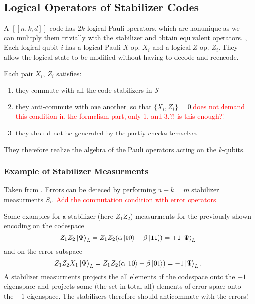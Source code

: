 \subsection{Logical Operators of Stabilizer Codes}
A $[[n,k,d]]$ code has $2k$ logical Pauli operators, which are nonunique as we can mulitply them trivially with the stabilizer and obtain equivalent operators. \cite{QECintro},\cite{QECmemory} 
Each logical qubit $i$ has a logical Pauli-$X$ op. $\bar{X}_i$ and a logical-$Z$ op. $\bar{Z}_i$. 
They allow the logical state to be modified without having to decode and reencode. \cite{QECintro}

Each pair $\bar{X}_i$, $\bar{Z}_i$ satisfies:
\begin{enumerate}
    \item they commute with all the code stabilizers in $\mathcal{S}$ 
    \item they anti-commute with one another, so that $\{ \bar{X}_i, \bar{Z_i}\}=0$ \textcolor{red}{\cite{QECmemory} does not demand this condition in the formalism part, only 1. and 3.?! is this enough?!}
    \item they should not be generated by the partiy checks temselves \cite{QECmemory}
\end{enumerate}
They therefore realize the algebra of the Pauli operators acting on the $k$-qubits. \cite{QECmemory}


\subsubsection{Example of Stabilizer Measurments}
Taken from \cite{QECintro}.
Errors can be deteced by performing $n-k=m$ stabilizer measurments $S_i$.
\textcolor{red}{Add the commutation condition with error operators}

Some examples for a stabilizer (here $Z_1 Z_2$) measurments for the previously shown encoding on the codespace
\begin{equation}
    Z_1 Z_2 \ket{\Psi}_L = Z_1 Z_2 (\alpha \ket{00}+ \beta \ket{11}) = +1 \ket{\Psi}_L
\end{equation}
and on the error subspace
\begin{equation}
    Z_1 Z_2 X_1\ket{\Psi}_L = Z_1 Z_2 (\alpha \ket{10}+ \beta \ket{01}) = -1 \ket{\Psi}_L.
\end{equation}
A stabilizer measurments projects the all elements of the codespace onto the $+1$ eigenspace 
and projects some (the set in total all) elements of error space onto the $-1$ eigenspace. 
The stabilizers therefore should anticommute with the errors! 

